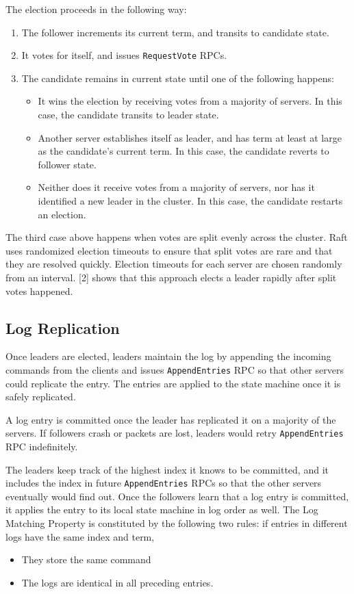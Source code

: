 \documentclass[11pt]{article}
\begin{document}
The election proceeds in the following way:
\begin{enumerate}
    \item The follower increments its current term, and transits to candidate state.
    \item It votes for itself, and issues \texttt{RequestVote} RPCs.
    \item The candidate remains in current state until one of the following happens:
    \begin{itemize}
        \item It wins the election by receiving votes from a majority of servers. In this case, the candidate transits to leader state.
        \item Another server establishes itself as leader, and has term at least at large as the candidate's current term. In this case, the candidate reverts to follower state.
        \item Neither does it receive votes from a majority of servers, nor has it identified a new leader in the cluster. In this case, the candidate restarts an election.
    \end{itemize}
\end{enumerate}

The third case above happens when votes are split evenly across the cluster. Raft uses randomized election timeouts to ensure that split votes are rare and that they are resolved quickly. Election timeouts for each server are chosen randomly from an interval. [2] shows that this approach elects a leader rapidly after split votes happened.




\subsection{Log Replication}
Once leaders are elected, leaders maintain the log by appending the incoming commands from the clients and issues \texttt{AppendEntries} RPC so that other servers could replicate the entry. The entries are applied to the state machine once it is safely replicated.

A log entry is committed once the leader has replicated it on a majority of the servers. 
If followers crash or packets are lost, leaders would retry \texttt{AppendEntries} RPC indefinitely.

The leaders keep track of the highest index it knows to be committed, and it includes the index in future \texttt{AppendEntries} RPCs so that the other servers eventually would find out. Once the followers learn that a log entry is committed, it applies the entry to its local state machine in log order as well. The Log Matching Property is constituted by the following two rules: if entries in different logs have the same index and term, 
\begin{itemize}
    \item They store the same command
    \item The logs are identical in all preceding entries. 
\end{itemize}
\end{document}
